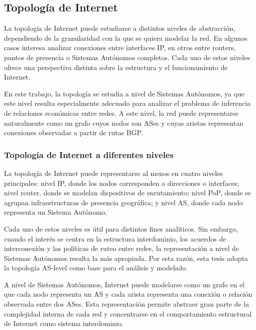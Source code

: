 \subsection{Topología de Internet}\label{}

La topología de Internet puede estudiarse a distintos niveles de abstracción, dependiendo de la granularidad con la que se quiera modelar la red. 
En algunos casos interesa analizar conexiones entre interfaces IP, en otros entre routers, puntos de presencia o Sistemas Autónomos completos. Cada uno de estos niveles ofrece una perspectiva distinta sobre la estructura y el funcionamiento de Internet.

En este trabajo, la topología se estudia a nivel de Sistemas Autónomos, ya que este nivel resulta especialmente adecuado para analizar el problema de inferencia de relaciones económicas entre redes. A este nivel, la red puede representarse naturalmente como un grafo cuyos nodos son ASes y cuyas aristas representan conexiones observadas a partir de rutas BGP.

\subsubsection{Topología de Internet a diferentes niveles}

La topología de Internet puede representarse al menos en cuatro niveles principales: nivel IP, donde los nodos corresponden a direcciones o interfaces; nivel router, donde se modelan dispositivos de enrutamiento; nivel PoP, donde se agrupan infraestructuras de presencia geográfica; y nivel AS, donde cada nodo representa un Sistema Autónomo.

Cada uno de estos niveles es útil para distintos fines analíticos. Sin embargo, cuando el interés se centra en la estructura interdominio, los acuerdos de interconexión y las políticas de ruteo entre redes, la representación a nivel de Sistemas Autónomos resulta la más apropiada. Por esta razón, esta tesis adopta la topología AS-level como base para el análisis y modelado.



A nivel de Sistemas Autónomos, Internet puede modelarse como un grafo en el que cada nodo representa un AS y cada arista representa una conexión o relación observada entre dos ASes. Esta representación permite abstraer gran parte de la complejidad interna de cada red y concentrarse en el comportamiento estructural de Internet como sistema interdominio.


